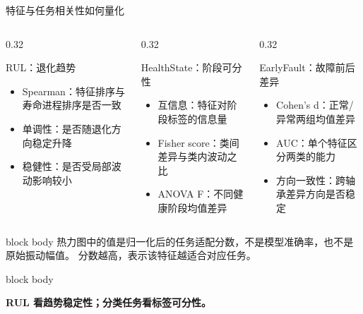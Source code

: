\documentclass[aspectratio=169,11pt]{ctexbeamer}
\newcommand{\takeaway}[1]{%
  \vspace{0.18em}
  \begin{beamercolorbox}[wd=\linewidth,rounded=true,sep=0.58em]{block body}
    \parbox{\dimexpr\linewidth-1.16em\relax}{\raggedright\small\color{phmblue}\bfseries #1}
  \end{beamercolorbox}
}
\begin{document}
\begin{frame}[t]{特征与任务相关性如何量化}
  \begin{columns}[T,onlytextwidth]
    \begin{column}{0.32\textwidth}
      \begin{block}{RUL：退化趋势}
        \begin{itemize}
          \item Spearman：特征排序与寿命进程排序是否一致
          \item 单调性：是否随退化方向稳定升降
          \item 稳健性：是否受局部波动影响较小
        \end{itemize}
      \end{block}
    \end{column}
    \begin{column}{0.32\textwidth}
      \begin{block}{HealthState：阶段可分性}
        \begin{itemize}
          \item 互信息：特征对阶段标签的信息量
          \item Fisher score：类间差异与类内波动之比
          \item ANOVA F：不同健康阶段均值差异
        \end{itemize}
      \end{block}
    \end{column}
    \begin{column}{0.32\textwidth}
      \begin{block}{EarlyFault：故障前后差异}
        \begin{itemize}
          \item Cohen's d：正常/异常两组均值差异
          \item AUC：单个特征区分两类的能力
          \item 方向一致性：跨轴承差异方向是否稳定
        \end{itemize}
      \end{block}
    \end{column}
  \end{columns}

  \vspace{0.5em}
  \begin{beamercolorbox}[wd=\linewidth,rounded=true,sep=0.6em]{block body}
    \small
    热力图中的值是归一化后的任务适配分数，不是模型准确率，也不是原始振动幅值。
    分数越高，表示该特征越适合对应任务。
  \end{beamercolorbox}

  \takeaway{RUL 看趋势稳定性；分类任务看标签可分性。}
\end{frame}
\end{document}
